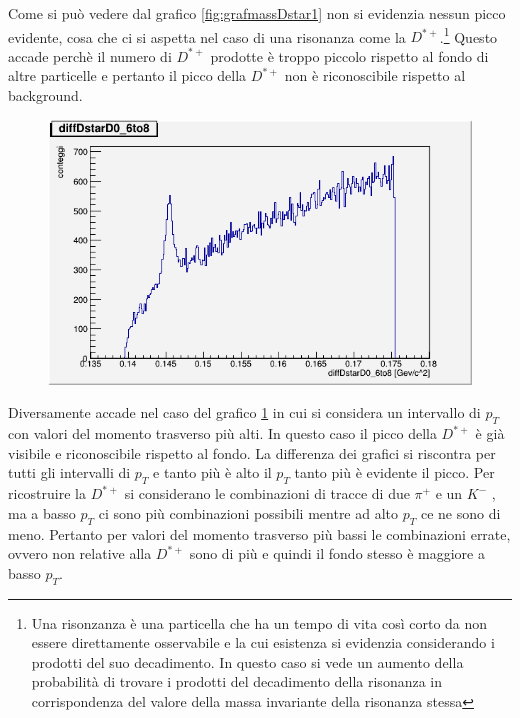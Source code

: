 Come si può vedere dal grafico \ref{fig:grafmassDstar1} non si evidenzia nessun picco evidente, cosa che ci si aspetta nel caso di una risonanza come la $D^{*+}$.\footnote{Una risonzanza è una particella che ha un tempo di vita così corto da non essere direttamente osservabile e la cui esistenza si evidenzia considerando i prodotti del suo decadimento. In questo caso si vede un aumento della probabilità di trovare i prodotti del decadimento della risonanza in corrispondenza del valore della massa invariante della risonanza stessa} Questo accade perchè il numero di $D^{*+}$ prodotte è troppo piccolo rispetto al fondo di altre particelle e pertanto il picco della $D^{*+}$ non è riconoscibile rispetto al background.

    \begin{figure}[htbp]
        \centering
        \includegraphics[width=0.7\linewidth]{training&testing/diffDstarD0_6to8.png}
        \caption{}
        \label{fig:grafmassDstar2}
    \end{figure}


Diversamente accade nel caso del grafico \ref{fig:grafmassDstar2} in cui si considera un intervallo di $p_T$ con valori del momento trasverso più alti. In questo caso il picco della $D^{*+}$ è già visibile e riconoscibile rispetto al fondo. 
La differenza dei grafici si riscontra per tutti gli intervalli di $p_T$ e tanto più è alto il $p_T$ tanto più è evidente il picco. Per ricostruire la $D^{*+}$ si considerano le combinazioni di tracce di due $\pi^+$ e un $K^-$ , ma a basso $p_T$ ci sono più combinazioni possibili mentre ad alto $p_T$ ce ne sono di meno. Pertanto per valori del momento trasverso più bassi le combinazioni errate, ovvero non relative alla $D^{*+}$ sono di più e quindi il fondo stesso è maggiore a basso $p_T$.

